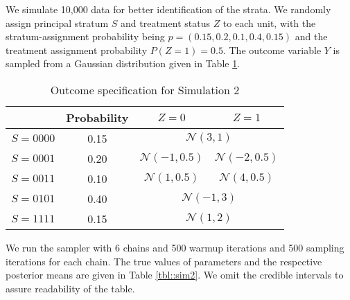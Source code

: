 \documentclass{article}
\begin{document}
We simulate 10,000 data for better identification of the strata. We randomly assign principal stratum $S$ and treatment status $Z$ to each unit, with the stratum-assignment probability being $p = (0.15, 0.2, 0.1, 0.4, 0.15)$ and the treatment assignment probability $P(Z = 1) = 0.5$. The outcome variable $Y$ is sampled from a Gaussian distribution given in Table \ref{tbl::outcome_sim2}.

\begin{table}[h]
  \centering
  \begin{tabular}{cccc}
    \toprule
    & Probability & $Z = 0$ & $Z = 1$ \\
    \midrule
    $S = 0000$ & 0.15 & \multicolumn{2}{c}{$\mathcal{N}(3,1)$} \\
    $S = 0001$ & 0.20& $\mathcal{N}(-1, 0.5)$ & $\mathcal{N}(-2, 0.5)$ \\
    $S = 0011$ & 0.10 & $\mathcal{N}(1, 0.5)$ & $\mathcal{N}(4, 0.5)$ \\
    $S = 0101$ & 0.40 & \multicolumn{2}{c}{$\mathcal{N}(-1, 3)$} \\
    $S = 1111$ & 0.15& \multicolumn{2}{c}{$\mathcal{N}(1, 2)$} \\
    \bottomrule
  \end{tabular}
  \caption{Outcome specification for Simulation 2}
  \label{tbl::outcome_sim2}
\end{table}

We run the sampler with 6 chains and 500 warmup iterations and 500 sampling iterations for each chain. The true values of parameters and the respective posterior means are given in Table \ref{tbl::sim2}. We omit the credible intervals to assure readability of the table.
\end{document}
